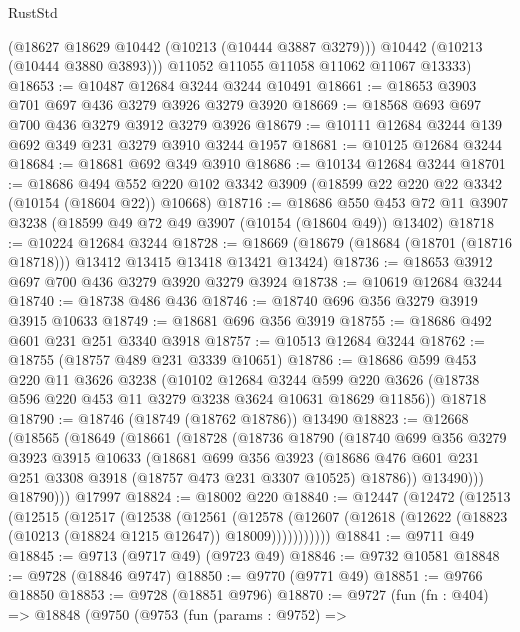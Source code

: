 \begin{lexlean}{RustStd}
\begin{coremodule}
{\begin{coremodule}
{{{{{{{{{{{{{{{{{{{{{{{{{{        (@18627 @18629 @10442 (@10213 (@10444 @3887 @3279)))
        @10442
        (@10213 (@10444 @3880 @3893)))
      @11052
      @11055
      @11058
      @11062
      @11067
      @13333)
@18653 := @10487 @12684 @3244 @3244 @10491
@18661 := @18653 @3903 @701 @697 @436 @3279 @3926 @3279 @3920
@18669 := @18568 @693 @697 @700 @436 @3279 @3912 @3279 @3926
@18679 := @10111 @12684 @3244 @139 @692 @349 @231 @3279 @3910 @3244 @1957
@18681 := @10125 @12684 @3244
@18684 := @18681 @692 @349 @3910
@18686 := @10134 @12684 @3244
@18701 := @18686
    @494
    @552
    @220
    @102
    @3342
    @3909
    (@18599 @22 @220 @22 @3342 (@10154 (@18604 @22)) @10668)
@18716 := @18686
    @550
    @453
    @72
    @11
    @3907
    @3238
    (@18599 @49 @72 @49 @3907 (@10154 (@18604 @49)) @13402)
@18718 := @10224 @12684 @3244
@18728 := @18669 (@18679 (@18684 (@18701 (@18716 @18718))) @13412 @13415 @13418 @13421 @13424)
@18736 := @18653 @3912 @697 @700 @436 @3279 @3920 @3279 @3924
@18738 := @10619 @12684 @3244
@18740 := @18738 @486 @436
@18746 := @18740 @696 @356 @3279 @3919 @3915 @10633
@18749 := @18681 @696 @356 @3919
@18755 := @18686 @492 @601 @231 @251 @3340 @3918
@18757 := @10513 @12684 @3244
@18762 := @18755 (@18757 @489 @231 @3339 @10651)
@18786 := @18686
    @599
    @453
    @220
    @11
    @3626
    @3238
    (@10102
      @12684
      @3244
      @599
      @220
      @3626
      (@18738 @596 @220 @453 @11 @3279 @3238 @3624 @10631 @18629 @11856))
    @18718
@18790 := @18746 (@18749 (@18762 @18786)) @13490
@18823 := @12668
    (@18565
      (@18649
        (@18661
          (@18728
            (@18736
              @18790
              (@18740
                @699
                @356
                @3279
                @3923
                @3915
                @10633
                (@18681
                  @699
                  @356
                  @3923
                  (@18686 @476 @601 @231 @251 @3308 @3918 (@18757 @473 @231 @3307 @10525) @18786))
                @13490)))
          @18790)))
    @17997
@18824 := @18002 @220
@18840 := @12447
    (@12472
      (@12513
        (@12515
          (@12517
            (@12538
              (@12561
                (@12578
                  (@12607 (@12618 (@12622 (@18823 (@10213 (@18824 @1215 @12647)) @18009)))))))))))
@18841 := @9711 @49
@18845 := @9713 (@9717 @49) (@9723 @49)
@18846 := @9732 @10581
@18848 := @9728 (@18846 @9747)
@18850 := @9770 (@9771 @49)
@18851 := @9766 @18850
@18853 := @9728 (@18851 @9796)
@18870 := @9727
    (fun (fn : @404) =>
    @18848
      (@9750
        (@9753
          (fun (params : @9752) =>
}}}}}}}}}}}}}}}}}}}}}}}}}}
\end{coremodule}}
\end{coremodule}
\end{lexlean}
